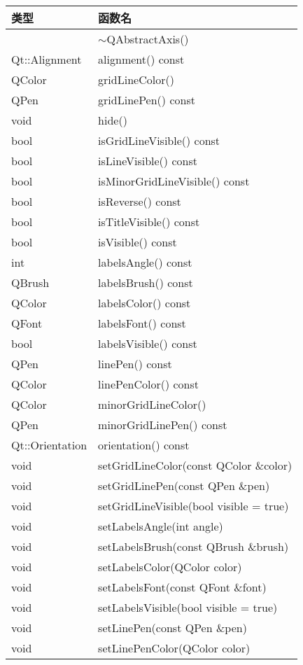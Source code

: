 \begin{longtable}[l]{|l|l|}
\hline
类型  & 函数名\\
\hline
& $\sim$QAbstractAxis() \\
\hline
Qt::Alignment&	alignment() const \\
\hline
QColor&	gridLineColor()\\
\hline
QPen&	gridLinePen() const\\
\hline
void&	hide()\\
\hline
bool&	isGridLineVisible() const\\
\hline
bool&	isLineVisible() const\\
\hline
bool&	isMinorGridLineVisible() const\\
\hline
bool&	isReverse() const\\
\hline
bool&	isTitleVisible() const\\
\hline
bool&	isVisible() const\\
\hline
int&	labelsAngle() const\\
\hline
QBrush&	labelsBrush() const\\
\hline
QColor&	labelsColor() const\\
\hline
QFont&	labelsFont() const\\
\hline
bool&	labelsVisible() const\\
\hline
QPen&	linePen() const\\
\hline
QColor&	linePenColor() const\\
\hline
QColor&	minorGridLineColor()\\
\hline
QPen&	minorGridLinePen() const\\
\hline
Qt::Orientation &orientation() const\\
\hline
void&	setGridLineColor(const QColor \&color)\\
\hline
void&	setGridLinePen(const QPen \&pen)\\
\hline
void&	setGridLineVisible(bool visible = true)\\
\hline
void&	setLabelsAngle(int angle)\\
\hline
void&	setLabelsBrush(const QBrush \&brush)\\
\hline
void&	setLabelsColor(QColor color)\\
\hline
void&	setLabelsFont(const QFont \&font)\\
\hline
void	&setLabelsVisible(bool visible = true)\\
\hline
void	&setLinePen(const QPen \&pen)\\
\hline
void	&setLinePenColor(QColor color)\\

\end{longtable}
